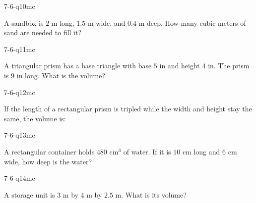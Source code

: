 \begin{practiceQuestion}{7-6-q10}{mc}
\begin{questionText}
A sandbox is $2$ m long, $1.5$ m wide, and $0.4$ m deep. How many cubic meters of sand are needed to fill it?
\end{questionText}
\end{practiceQuestion}

\begin{practiceQuestion}{7-6-q11}{mc}
\begin{questionText}
A triangular prism has a base triangle with base $5$ in and height $4$ in. The prism is $9$ in long. What is the volume?
\end{questionText}
\end{practiceQuestion}

\begin{practiceQuestion}{7-6-q12}{mc}
\begin{questionText}
If the length of a rectangular prism is tripled while the width and height stay the same, the volume is:
\end{questionText}
\end{practiceQuestion}

\begin{practiceQuestion}{7-6-q13}{mc}
\begin{questionText}
A rectangular container holds $480$ cm$^3$ of water. If it is $10$ cm long and $6$ cm wide, how deep is the water?
\end{questionText}
\end{practiceQuestion}

\begin{practiceQuestion}{7-6-q14}{mc}
\begin{questionText}
A storage unit is $3$ m by $4$ m by $2.5$ m. What is its volume?
\end{questionText}
\end{practiceQuestion}

